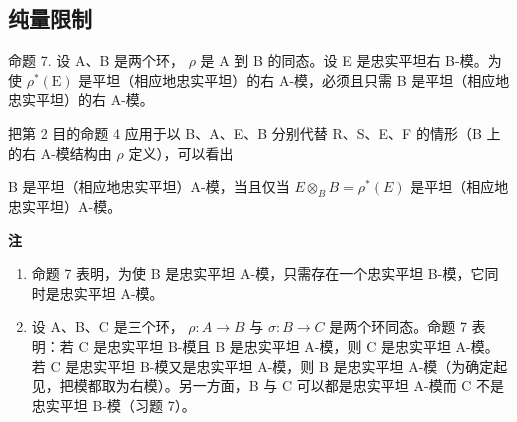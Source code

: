 \subsection{纯量限制}

命题 7. 设 A、B 是两个环， \(\rho\) 是 A 到 B 的同态。设 E 是忠实平坦右 B-模。为使 \(\rho^{*}(\mathrm{E})\) 是平坦（相应地忠实平坦）的右 A-模，必须且只需 B 是平坦（相应地忠实平坦）的右 A-模。

把第 2 目的命题 4 应用于以 B、A、E、B 分别代替 R、S、E、F 的情形（B 上的右 A-模结构由 \(\rho\) 定义），可以看出

B 是平坦（相应地忠实平坦）A-模，当且仅当 \(E \otimes_{B} B = \rho^{*}(E)\) 是平坦（相应地忠实平坦）A-模。

\textbf{注}\par

\begin{enumerate}
\def\labelenumi{(\arabic{enumi})}
\item
  命题 7 表明，为使 B 是忠实平坦 A-模，只需存在一个忠实平坦 B-模，它同时是忠实平坦 A-模。
\item
  设 A、B、C 是三个环， \(\rho: A \rightarrow B\) 与 \(\sigma: B \rightarrow C\) 是两个环同态。命题 7 表明：若 C 是忠实平坦 B-模且 B 是忠实平坦 A-模，则 C 是忠实平坦 A-模。若 C 是忠实平坦 B-模又是忠实平坦 A-模，则 B 是忠实平坦 A-模（为确定起见，把模都取为右模）。另一方面，B 与 C 可以都是忠实平坦 A-模而 C 不是忠实平坦 B-模（习题 7）。
\end{enumerate}

